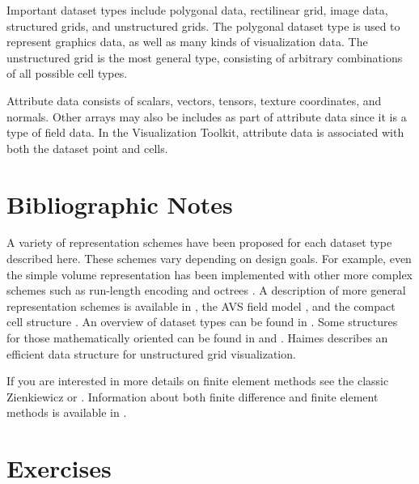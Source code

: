 Important dataset types include polygonal data, rectilinear grid, image data, structured grids, and unstructured grids. The polygonal dataset type is used to represent graphics data, as well as many kinds of visualization data. The unstructured grid is the most general type, consisting of arbitrary combinations of all possible cell types.

Attribute data consists of scalars, vectors, tensors, texture coordinates, and normals. Other arrays may also be includes as part of attribute data since it is a type of field data. In the Visualization Toolkit, attribute data is associated with both the dataset point and cells.

\section{Bibliographic Notes}

A variety of representation schemes have been proposed for each dataset type described here. These schemes vary depending on design goals. For example, even the simple volume representation has been implemented with other more complex schemes such as run-length encoding and octrees \cite{Bloomenthal88}. A description of more general representation schemes is available in \cite{Haber91}, the AVS field model \cite{AVS89}, and the compact cell structure \cite{Schroeder94}. An overview of dataset types can be found in \cite{Gelberg90}. Some structures for those mathematically oriented can be found in \cite{Brisson90} and \cite{Poluzzi93}. Haimes \cite{VISUAL3} describes an efficient data structure for unstructured grid visualization.

If you are interested in more details on finite element methods see the classic Zienkiewicz \cite{Zienkiewicz87} or \cite{Gallagher75}. Information about both finite difference and finite element methods is available in \cite{Lapidus82}.

\printbibliography


\section{Exercises}

